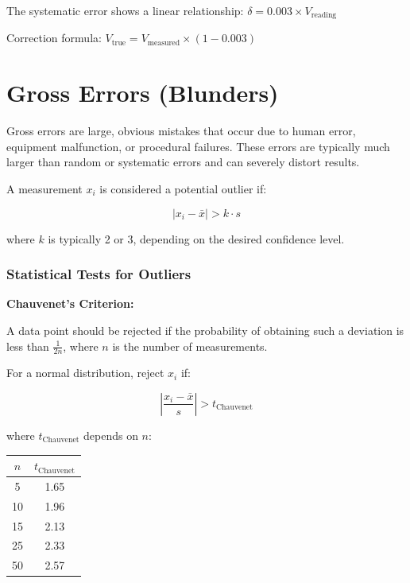 \documentclass[twoside]{book}
\begin{document}
The systematic error shows a linear relationship: $\delta = 0.003 \times V_{\text{reading}}$

Correction formula: $V_{\text{true}} = V_{\text{measured}} \times (1 - 0.003)$

\section{Gross Errors (Blunders)}

Gross errors are large, obvious mistakes that occur due to human error, equipment malfunction, or procedural failures. These errors are typically much larger than random or systematic errors and can severely distort results.

A measurement $x_i$ is considered a potential outlier if:

\begin{equation*}
|x_i - \bar{x}| > k \cdot s
\end{equation*}

where $k$ is typically 2 or 3, depending on the desired confidence level.

\subsubsection{Statistical Tests for Outliers}

\textbf{Chauvenet's Criterion:}

A data point should be rejected if the probability of obtaining such a deviation is less than $\frac{1}{2n}$, where $n$ is the number of measurements.

For a normal distribution, reject $x_i$ if:

\begin{equation}
\left|\frac{x_i - \bar{x}}{s}\right| > t_{\text{Chauvenet}}
\end{equation}

where $t_{\text{Chauvenet}}$ depends on $n$:

\begin{center}
\begin{tabular}{cc}
\toprule
$n$ & $t_{\text{Chauvenet}}$ \\
\midrule
5 & 1.65 \\
10 & 1.96 \\
15 & 2.13 \\
25 & 2.33 \\
50 & 2.57 \\
\bottomrule
\end{tabular}
\end{center}
\end{document}
